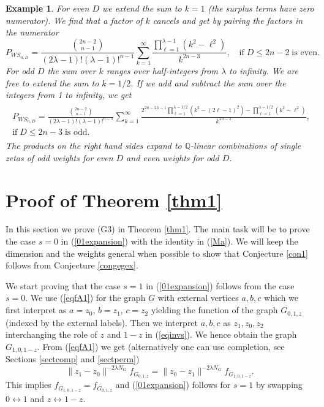 \documentclass[oneside]{amsart}
\newcommand{\QQ}{{\mathbb Q}}
\theoremstyle{plain}
\newtheorem{ex}[thm]{Example}
\begin{document}
\begin{ex}
For even $D$ we extend the sum to $k=1$ (the surplus terms have zero numerator). We find that a factor of $k$ cancels and get by pairing the factors in the numerator
\begin{equation}\label{evendwheels}
P_{W\!S_{n,D}}=\frac{\genfrac(){0pt}{}{2n-2}{n-1}}{(2\lambda-1)!(\lambda-1)!^{n-1}}\sum_{k=1}^\infty\frac{\prod_{\ell=1}^{\lambda-1}(k^2-\ell^2)}{k^{2n-3}},
 \quad\text{if}\;D\leq 2n-2\;\text{is even}.
\end{equation}
For odd $D$ the sum over $k$ ranges over half-integers from $\lambda$ to infinity. We are free to extend the sum to $k=1/2$. If we add and subtract the sum over the integers from
1 to infinity, we get
\begin{gather}
\begin{gathered}
\label{odddwheels}
P_{W\!S_{n,D}}=\frac{\genfrac(){0pt}{}{2n-2}{n-1}}{(2\lambda-1)!(\lambda-1)!^{n-1}}\sum_{k=1}^\infty
 \frac{2^{2n-2\lambda-1}\prod_{\ell=1}^{\lambda-1/2}(k^2-(2\ell-1)^2)-\prod_{\ell=1}^{\lambda-1/2}(k^2-\ell^2)}{k^{2n-2}},\; 
\\ \text{if}\;D\leq 2n-3\;\text{is odd}.
\end{gathered}
\end{gather}
The products on the right hand sides expand to $\QQ$-linear combinations of single zetas of odd weights for even $D$ and even weights for odd $D$.
\end{ex}

\section{Proof of Theorem \ref{thm1}}\label{sectpf1}
In this section we prove (G3) in Theorem \ref{thm1}. The main task will be to prove the case $s=0$ in (\ref{01expansion}) with the identity in (\ref{Ma}).
We will keep the dimension and the weights general when possible to show that Conjecture \ref{con1} follows from Conjecture \ref{congegex}.

We start proving that the case $s=1$ in (\ref{01expansion}) follows from the case $s=0$. We use (\ref{eqfA1}) for the graph $G$ with external vertices $a,b,c$ which
we first interpret as $a=z_0$, $b=z_1$, $c=z_2$ yielding the function of the graph $G_{0,1,z}$ (indexed by the external labels).
Then we interpret $a,b,c$ as $z_1,z_0,z_2$ interchanging the role of $z$ and $1-z$ in (\ref{eqinvs}). We hence obtain the graph $G_{1,0,1-z}$.
From (\ref{eqfA1}) we get (alternatively one can use completion, see Sections \ref{sectcomp} and \ref{sectperm})
$$
\|z_1-z_0\|^{-2\lambda N_G}f_{G_{0,1,z}}=\|z_0-z_1\|^{-2\lambda N_G}f_{G_{1,0,1-z}}.
$$
This implies $f_{G_{1,0,1-z}}=f_{G_{0,1,z}}$ and (\ref{01expansion}) follows for $s=1$ by swapping $0\leftrightarrow1$ and $z\leftrightarrow1-z$.
\end{document}
